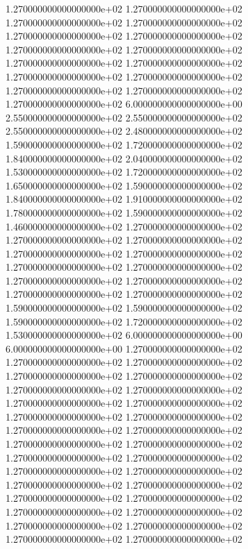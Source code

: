 1.270000000000000000e+02 1.270000000000000000e+02 1.270000000000000000e+02 1.270000000000000000e+02 1.270000000000000000e+02 1.270000000000000000e+02 1.270000000000000000e+02 1.270000000000000000e+02 1.270000000000000000e+02 1.270000000000000000e+02 1.270000000000000000e+02 1.270000000000000000e+02 1.270000000000000000e+02 1.270000000000000000e+02 1.270000000000000000e+02 6.000000000000000000e+00 2.550000000000000000e+02 2.550000000000000000e+02 2.550000000000000000e+02 2.480000000000000000e+02 1.590000000000000000e+02 1.720000000000000000e+02 1.840000000000000000e+02 2.040000000000000000e+02 1.530000000000000000e+02 1.720000000000000000e+02 1.650000000000000000e+02 1.590000000000000000e+02 1.840000000000000000e+02 1.910000000000000000e+02 1.780000000000000000e+02 1.590000000000000000e+02 1.460000000000000000e+02 1.270000000000000000e+02 1.270000000000000000e+02 1.270000000000000000e+02 1.270000000000000000e+02 1.270000000000000000e+02 1.270000000000000000e+02 1.270000000000000000e+02 1.270000000000000000e+02 1.270000000000000000e+02 1.270000000000000000e+02 1.270000000000000000e+02 1.590000000000000000e+02 1.590000000000000000e+02 1.590000000000000000e+02 1.720000000000000000e+02 1.530000000000000000e+02 6.000000000000000000e+00 6.000000000000000000e+00 1.270000000000000000e+02 1.270000000000000000e+02 1.270000000000000000e+02 1.270000000000000000e+02 1.270000000000000000e+02 1.270000000000000000e+02 1.270000000000000000e+02 1.270000000000000000e+02 1.270000000000000000e+02 1.270000000000000000e+02 1.270000000000000000e+02 1.270000000000000000e+02 1.270000000000000000e+02 1.270000000000000000e+02 1.270000000000000000e+02 1.270000000000000000e+02 1.270000000000000000e+02 1.270000000000000000e+02 1.270000000000000000e+02 1.270000000000000000e+02 1.270000000000000000e+02 1.270000000000000000e+02 1.270000000000000000e+02 1.270000000000000000e+02 1.270000000000000000e+02 1.270000000000000000e+02 1.270000000000000000e+02 1.270000000000000000e+02 1.270000000000000000e+02
